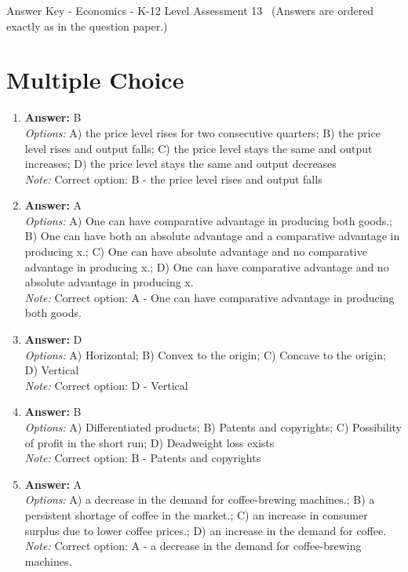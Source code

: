 \documentclass[12pt]{article}
\begin{document}
\begin{center}
Answer Key - Economics - K-12 Level Assessment 13 \
\small (Answers are ordered exactly as in the question paper.)
\end{center}

\section*{Multiple Choice}
\begin{enumerate}[label=\arabic*.]
\item \textbf{Answer:} B
\\ \textit{Options:} A) the price level rises for two consecutive quarters; B) the price level rises and output falls; C) the price level stays the same and output increases; D) the price level stays the same and output decreases
\\ \textit{Note:} Correct option: B - the price level rises and output falls
\item \textbf{Answer:} A
\\ \textit{Options:} A) One can have comparative advantage in producing both goods.; B) One can have both an absolute advantage and a comparative advantage in producing x.; C) One can have absolute advantage and no comparative advantage in producing x.; D) One can have comparative advantage and no absolute advantage in producing x.
\\ \textit{Note:} Correct option: A - One can have comparative advantage in producing both goods.
\item \textbf{Answer:} D
\\ \textit{Options:} A) Horizontal; B) Convex to the origin; C) Concave to the origin; D) Vertical
\\ \textit{Note:} Correct option: D - Vertical
\item \textbf{Answer:} B
\\ \textit{Options:} A) Differentiated products; B) Patents and copyrights; C) Possibility of profit in the short run; D) Deadweight loss exists
\\ \textit{Note:} Correct option: B - Patents and copyrights
\item \textbf{Answer:} A
\\ \textit{Options:} A) a decrease in the demand for coffee-brewing machines.; B) a persistent shortage of coffee in the market.; C) an increase in consumer surplus due to lower coffee prices.; D) an increase in the demand for coffee.
\\ \textit{Note:} Correct option: A - a decrease in the demand for coffee-brewing machines.
\end{enumerate}
\end{document}
